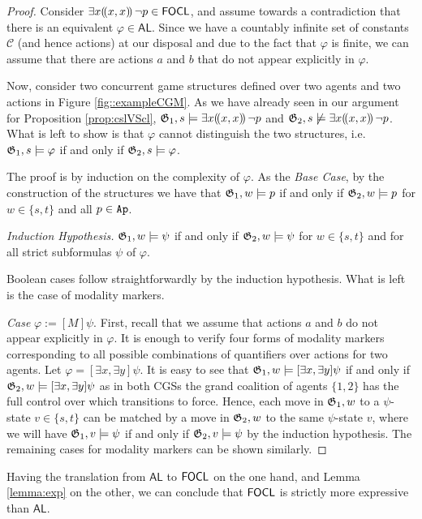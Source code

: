 \documentclass[sigconf,anonymous]{aamas}
\begin{document}
\begin{proof}
    Consider $\exists x (\!( x, x )\!)\, \lnot p \in \mathsf{FOCL}$, and assume towards a contradiction that there is an equivalent $\varphi \in \mathsf{AL}$. Since we have a countably infinite set of constants $\mathcal{C}$ (and hence actions) at our disposal  and due to the fact that $\varphi$ is finite, we can assume that there are actions $a$ and $b$ that do not appear explicitly in $\varphi$. 

Now, consider two concurrent game structures defined over two agents and two actions in Figure \ref{fig::exampleCGM}. As we have already seen in our argument for Proposition \ref{prop:cslVScl}, $\mathfrak{G}_1,s \models \exists x (\!( x, x )\!)\, \lnot p$ and $\mathfrak{G}_2,s \not \models \exists x (\!( x, x )\!)\, \lnot p$. What is left to show is that $\varphi$ cannot distinguish the two structures, i.e. $\mathfrak{G}_1,s \models \varphi$ if and only if $\mathfrak{G}_2, s \models \varphi$.

    The proof is by induction on the complexity of $\varphi$. As the \textit{Base Case}, by the construction of the structures we have that $\mathfrak{G}_1,w \models p$ if and only if $\mathfrak{G}_2,w \models p$ for $w \in \{s,t\}$ and all $p \in \texttt{Ap}$. 

    \textit{Induction Hypothesis.} $\mathfrak{G}_1,w \models \psi$ if and only if $\mathfrak{G}_2, w \models \psi$  for $w \in \{s,t\}$ and for all strict subformulas $\psi$ of $\varphi$.
    
    Boolean cases follow straightforwardly by the induction hypothesis. What is left is the case of modality markers. 

   \textit{Case } $\varphi := [M]\psi$. First, recall that we assume that actions $a$ and $b$ do not appear explicitly in $\varphi$. It is enough to verify four forms of modality markers corresponding to all possible combinations of quantifiers over actions for two agents. Let $\varphi = [\exists x, \exists y] \psi$. It is easy to see that  $\mathfrak{G}_1,w \models [\exists x, \exists y] \psi$ if and only if $\mathfrak{G}_2,w \models [\exists x, \exists y] \psi$ as in both CGSs the grand coalition of agents $\{1,2\}$ has the full control over which transitions to force. Hence, each move in $\mathfrak{G}_1,w$ to a $\psi$-state $v \in \{s,t\}$ can be matched by a move in  $\mathfrak{G}_2,w$ to the same $\psi$-state $v$, where we will have $\mathfrak{G}_1,v \models \psi$ if and only if $\mathfrak{G}_2,v \models \psi$ by the induction hypothesis. 
   The remaining cases for modality markers can be shown similarly.
\end{proof}

Having the translation from $\mathsf{AL}$ to $\mathsf{FOCL}$ on the one hand, and Lemma \ref{lemma:exp} on the other, we can conclude that $\mathsf{FOCL}$ is strictly more expressive than $\mathsf{AL}$.
\end{document}
